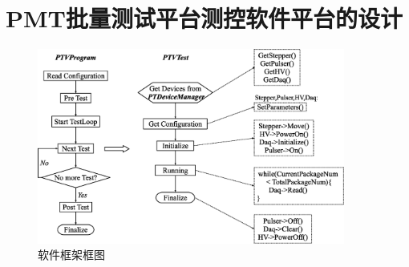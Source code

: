 
\chapter{PMT批量测试平台测控软件平台的设计}

\begin{figure}[htbp]
	\centering
	\includegraphics[width=0.9\textwidth]{chap/pmt_test/fig/software_framework.eps}
	\caption{软件框架框图}
	\label{fig:pmt_test:software_framework}
\end{figure}